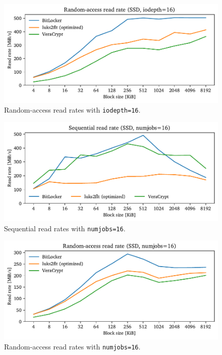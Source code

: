 \begin{figure}[htb!]
	\center
	\includegraphics[scale=1]{../fig/performance.hwexperiments.optrandqueue.pdf}
	\caption[
		Random-access read rates with \texttt{iodepth=16}
	]{
		Random-access read rates with \texttt{iodepth=16}. 
	}
	\label{fig:performance.hwexperiments.optrandqueue}
\end{figure}

\begin{figure}[htb!]
	\center
	\includegraphics[scale=1]{../fig/performance.hwexperiments.optseqthreads.pdf}
	\caption[
		Sequential read rates with \texttt{numjobs=16}
	]{
		Sequential read rates with \texttt{numjobs=16}. 
	}
	\label{fig:performance.hwexperiments.optseqthreads}
\end{figure}

\begin{figure}[htb!]
	\center
	\includegraphics[scale=1]{../fig/performance.hwexperiments.optrandthreads.pdf}
	\caption[
		Random-access read rates with \texttt{numjobs=16}
	]{
		Random-access read rates with \texttt{numjobs=16}. 
	}
	\label{fig:performance.hwexperiments.optrandthreads}
\end{figure}


